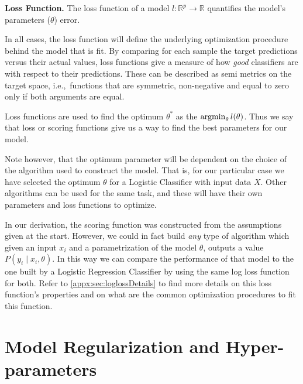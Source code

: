 \begin{definition}{\textbf{Loss Function.}}
The loss function of a model $l: \mathbb{R}^{ p} \rightarrow  \mathbb{R} $ quantifies the model's parameters ($\theta$) error.
\end{definition}

In all cases, the loss function will define the underlying optimization procedure behind the model that is fit.
By comparing for each sample the target predictions versus their actual values, loss functions give a measure of how \textit{good} classifiers are with respect to their predictions.
These can be described as semi metrics on the target space, i.e.,\ functions that are symmetric, non-negative and equal to zero only if both arguments are equal.

Loss functions are used to find the optimum $\theta^*$ as the $\operatorname*{argmin}_{\theta} l(\theta) $.
Thus we say that loss or scoring functions give us a way to find the best parameters for our model.

Note however, that the optimum parameter will be dependent on the choice of the algorithm used to construct the model.
That is, for our particular case we have selected the optimum $\theta$ for a Logistic Classifier with input data $X$.
Other algorithms can be used for the same task, and these will have their own parameters and loss functions to optimize.

In our derivation, the scoring function was constructed from the assumptions given at the start.
However, we could in fact build \textit{any} type of algorithm which given an input $x_i$ and a parametrization of the model $\theta$, outputs a value $P(y_i \mid x_i,\theta)$.
In this way we can compare the performance of that model to the one built by a Logistic Regression Classifier by using the same log loss function for both.
Refer to \cref{appx:sec:loglossDetails} to find more details on this loss function's properties and on what are the common optimization procedures to fit this function.



\section{Model Regularization and Hyper-parameters}\label{section-hyperParametersRegularization}


